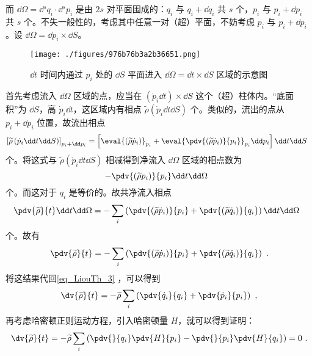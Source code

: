 而 $\dd \Omega = \dd{}^s q_i \cdot \dd{}^s p_i$ 是由 $2s$ 对平面围成的：$q_i$ 与 $q_i + \dd q_i$ 共 $s$ 个，$p_i$ 与 $p_i + \dd p_i$ 共 $s$ 个。不失一般性的，考虑其中任意一对（超）平面，不妨考虑 $p_i$ 与 $p_i+\dd p_i$ 。设 $\dd \Omega = \dd p_i \times \dd S$。
\begin{figure}[ht]
\centering
\texttt{[image: ./figures/976b76b3a2b36651.png]}
\caption{$\dd t$ 时间内通过 $p_i$ 处的 $\dd S$ 平面进入 $\dd \Omega = \dd t \times \dd S$ 区域的示意图} \label{fig_LiouTh_3}
\end{figure}
首先考虑流入 $\dd \Omega$ 区域的点，应当在 $\left(\dot p_i \dd t\right) \times \dd S$ 这个（超）柱体内。“底面积”为 $\dd S$，高 $\dot p_i \dd t$，这区域内有相点 $\widetilde \rho \left(\dot p_i \dd t \dd S \right)$ 个。类似的，流出的点从 $p_i + \dd p_i$ 位置，故流出相点
$$
\left[\widetilde \rho \left(\dot p_i \dd t \dd S\right)\right]_{p_i + \dd p_i} = \left[ \eval{\left(\widetilde\rho \dot p_i\right)}_{p_i} + \eval{\pdv{\left(\widetilde\rho \dot p_i\right)}{p_i}}_{p_i} \dd p_i \right] \dd t \dd S ~~
$$
个。将这式与 $\widetilde \rho \left(\dot p_i \dd t \dd S\right)$ 相减得到净流入 $\dd \Omega$ 区域的相点数为
\begin{equation}
- \pdv{\left(\widetilde \rho p_i\right)}{p_i} \dd t \dd \Omega ~~
\end{equation}
个。而这对于 $q_i$ 是等价的。故共净流入相点
\begin{equation}
\pdv{\widetilde \rho}{t} \dd t \dd \Omega = - \sum_{i} \left(\pdv{\left(\widetilde \rho \dot p_i\right)}{p_i} + \pdv{\left(\widetilde \rho \dot q_i\right)}{q_i}\right) \dd t \dd \Omega ~~
\end{equation}
个。故有
\begin{equation}\label{eq_LiouTh_2}
\pdv{\widetilde \rho}{t} = -\sum_{i} \left(\pdv{\left(\widetilde \rho \dot p_i\right)}{p_i} + \pdv{\left(\widetilde \rho \dot q_i\right)}{q_i}\right) ~.
\end{equation}
将这结果代回\autoref{eq_LiouTh_3} ，可以得到
\begin{equation}
\dv{\widetilde \rho}{t} = -\widetilde \rho \sum_{i} \left(\pdv{\dot q_i}{q_i} + \pdv{\dot p_i}{p_i}\right) ~,
\end{equation}
再考虑哈密顿正则运动方程，引入哈密顿量 $H$，就可以得到证明：
\begin{equation}
\dv{\widetilde \rho}{t} = -\widetilde \rho \sum_{i} \left(\pdv{}{q_i} \pdv{H}{p_i} - \pdv{}{p_i} \pdv{H}{q_i}\right) = 0 ~.
\end{equation}


